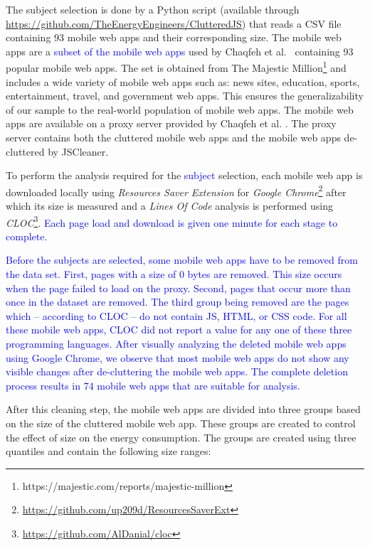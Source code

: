 The subject selection is done by a Python script (available through \textcolor{blue}{\url{https://github.com/TheEnergyEngineers/ClutteredJS}}) that reads a CSV file containing $93$ mobile web apps and their corresponding size. The mobile web apps are a \textcolor{blue}{subset of the mobile web apps} used by Chaqfeh et al.~\cite{chaqfeh2020jscleaner} containing $93$ popular mobile web apps. The set is obtained from The Majestic Million\footnote{https://majestic.com/reports/majestic-million} and includes a wide variety of mobile web apps such as: news sites, education, sports, entertainment, travel, and government web apps. This ensures the generalizability of our sample to the real-world population of mobile web apps. The mobile web apps are available on a proxy server provided by Chaqfeh et al. \cite{chaqfeh2020jscleaner}. The proxy server contains both the cluttered mobile web apps and the mobile web apps de-cluttered by JSCleaner. 

To perform the analysis required for the \textcolor{blue}{subject} selection, each mobile web app is downloaded locally using \textit{Resources Saver Extension} for \textit{Google Chrome}\footnote{\url{https://github.com/up209d/ResourcesSaverExt}} after which its size is measured and a \textit{Lines Of Code} analysis is performed using \textit{CLOC}\footnote{\url{https://github.com/AlDanial/cloc}}. \textcolor{blue}{Each page load and download is given one minute for each stage to complete.}

\textcolor{blue}{Before the subjects are selected, some mobile web apps have to be removed from the data set. First, pages with a size of 0 bytes are removed. This size occurs when the page failed to load on the proxy. Second, pages that occur more than once in the dataset are removed. The third group being removed are the pages which \--- according to CLOC \--- do not contain JS, HTML, or CSS code. For all these mobile web apps, CLOC did not report a value for any one of these three programming languages. After visually analyzing the deleted mobile web apps using Google Chrome, we observe that most mobile web apps do not show any visible changes after de-cluttering the mobile web apps. The complete deletion process results in \textcolor{blue}{$74$} mobile web apps that are suitable for analysis.} 

After this cleaning step, the mobile web apps are divided into three groups based on the size of the cluttered mobile web app. These groups are created to control the effect of size on the energy consumption. The groups are created using three quantiles and contain the following size ranges:

